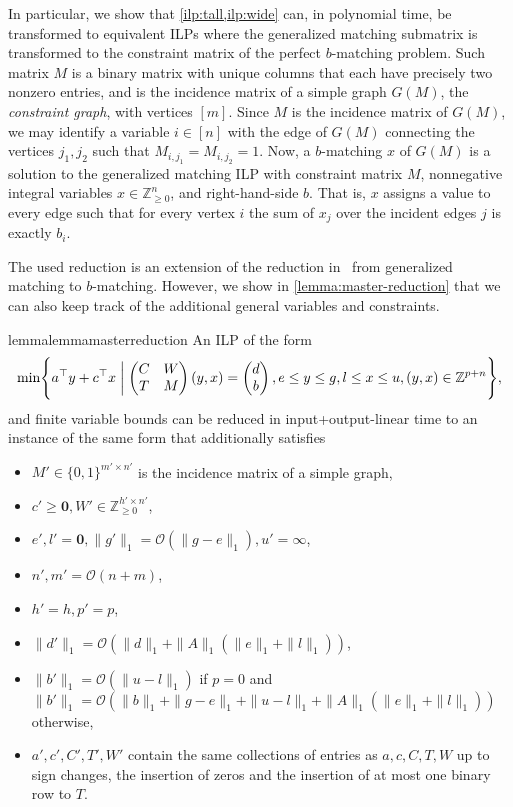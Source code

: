 \documentclass[a4paper,UKenglish,cleveref,thm-restate]{lipics-v2021}
\newcommand{\Z}{\mathbb Z}
\newcommand{\veczero}{\mathbf0}
\newcommand{\vecinfty}{\bm\infty}
\renewcommand{\O}{\mathcal O}
\begin{document}
In particular, we show that \cref{ilp:tall,ilp:wide} can, in polynomial time, be transformed to equivalent ILPs where the generalized matching submatrix is transformed to the constraint matrix of the perfect $b$-matching problem. Such matrix $M$ is a binary matrix with unique columns that each have precisely two nonzero entries, and is the incidence matrix of a simple graph $G(M)$, the \emph{constraint graph}, with vertices $[m]$. Since $M$ is the incidence matrix of $G(M)$, we may identify a variable $i\in[n]$ with the edge of $G(M)$ connecting the vertices $j_1,j_2$ such that $M_{i,j_1}=M_{i,j_2}=1$. Now, a $b$-matching $x$ of $G(M)$ is a solution to the generalized matching ILP with constraint matrix $M$, nonnegative integral variables $x\in\Z_{\ge0}^n$, and right-hand-side $b$. That is, $x$ assigns a value to every edge such that for every vertex $i$ the sum of $x_j$ over the incident edges $j$ is exactly $b_i$.

The used reduction is an extension of the reduction in~\cite{schrijver2003combinatorial} from generalized matching to $b$-matching. However, we show in \cref{lemma:master-reduction} that we can also keep track of the additional general variables and constraints.  

\begin{restatable}{lemma}{lemmamasterreduction}
    An ILP of the form
    \[
        \min\Biggl\{a^\top y+c^\top x\biggm\vert\begin{pmatrix}
            C&W\\
            T&M
        \end{pmatrix}(y,x)=\begin{pmatrix}
            d\\
            b
        \end{pmatrix},e\le y\le g,l\le x\le u,(y,x)\in\Z^{p+n}\Biggr\},
    \]
    and finite variable bounds can be reduced in input+output-linear time to an instance of the same form that additionally satisfies
    \begin{itemize}
        \item $M'\in\{0,1\}^{m'\times n'}$ is the incidence matrix of a simple graph,
        \item $c'\ge\veczero,W'\in\Z_{\ge0}^{h'\times n'}$,
        \item $e',l'=\veczero,\|g'\|_1=\O(\|g-e\|_1),u'=\vecinfty$,
        \item $n',m'=\O(n+m)$,
        \item $h'=h,p'=p$,
        \item $\|d'\|_1=\O(\|d\|_1+\|A\|_1(\|e\|_1+\|l\|_1))$,
        \item $\|b'\|_1=\O(\|u-l\|_1)$ if $p=0$ and $\|b'\|_1=\O(\|b\|_1+\|g-e\|_1+\|u-l\|_1+\|A\|_1(\|e\|_1+\|l\|_1))$ otherwise,
        \item $a',c',C',T',W'$ contain the same collections of entries as $a,c,C,T,W$ up to sign changes, the insertion of zeros and the insertion of at most one binary row to $T$.\\
    \end{itemize}
    \label{lemma:master-reduction}
\end{restatable}
\end{document}
